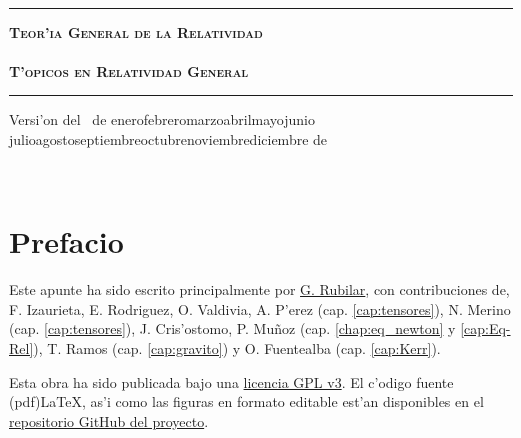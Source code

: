 \documentclass[letterpaper,11pt]{report}
\def\today{\number\day~de\space\ifcase\month\or
 enero\or febrero\or marzo\or abril\or mayo\or junio\or
 julio\or agosto\or septiembre\or octubre\or noviembre\or diciembre\fi
 \space de~\number\year}
\begin{document}
\thispagestyle{empty}
\begin{center}

\

\vspace{6.5cm}

\rule{15cm}{0.1cm}

\vspace{1.5cm}

{\huge \textsc{\textbf{Teor'ia General de la Relatividad \\ \ \\ T'opicos en Relatividad General}}}

\vspace{1.5cm}

\rule{15cm}{0.1cm}

\vspace{1.5cm}

Versi'on del \today

\end{center}


\newpage
\thispagestyle{empty}
\ \\
\newpage
\setcounter{page}{1}

\pagestyle{plain}
\chapter*{Prefacio}
\bigskip
\bigskip
\bigskip
\bigskip
\bigskip
\bigskip



Este apunte ha sido escrito principalmente por \href{https://google.com/+GuillermoRubilar}{G. Rubilar}, con contribuciones de, F. Izaurieta, E. Rodriguez, O. Valdivia, A. P'erez (cap. \ref{cap:tensores}), N. Merino (cap. \ref{cap:tensores}), J. Cris'ostomo, P. Mu\~noz (cap. \ref{chap:eq_newton} y \ref{cap:Eq-Rel}), T. Ramos (cap. \ref{cap:gravito}) y O. Fuentealba (cap. \ref{cap:Kerr}).


\bigskip
\bigskip
\bigskip
\bigskip
\bigskip
\bigskip



Esta obra ha sido publicada bajo una \href{https://github.com/gfrubi/GR/blob/master/LICENSE}{licencia GPL v3}. El c'odigo fuente (pdf)\LaTeX, as'i como las figuras en formato editable est'an disponibles en el \href{https://github.com/gfrubi/GR}{repositorio GitHub del proyecto}.


\bigskip
\bigskip
\bigskip

\end{document}
